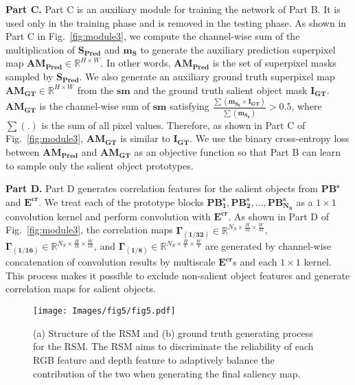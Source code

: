 \documentclass[runningheads]{llncs}
\begin{document}
	\noindent
	\textbf{Part C.} Part C is an auxiliary module for training the network of Part B. It is used only in the training phase and is removed in the testing phase. As shown in Part C in Fig.~\ref{fig:module3}, we compute the channel-wise sum of the multiplication of $\mathbf{S_{Pred}}$ and $\mathbf{m_S}$ to generate the auxiliary prediction superpixel map $\mathbf{AM_{Pred}} \in \mathbb{R} ^ {H \times W}$. In other words, $\mathbf{AM_{Pred}}$ is the set of superpixel masks sampled by $\mathbf{S_{Pred}}$. We also generate an auxiliary ground truth superpixel map $\mathbf{AM_{GT}} \in \mathbb{R} ^ {H \times W}$ from the $\mathbf{sm}$ and the ground truth salient object mask $\mathbf{I_{GT}}$. $\mathbf{AM_{GT}}$ is the channel-wise sum of $\mathbf{sm}$ satisfying $\frac{ \sum \left ( \mathbf{m _ { S _ { k } }} \times \mathbf{I _ { GT }} \right ) } { \sum \left ( \mathbf{m _ { S _ { k } }} \right ) } >0.5$, where $\sum \left( . \right)$ is the sum of all pixel values. Therefore, as shown in Part C of Fig.~\ref{fig:module3}, $\mathbf{AM_{GT}}$ is similar to $\mathbf{I_{GT}}$. We use the binary cross-entropy loss between $\mathbf{AM_{Pred}}$ and $\mathbf{AM_{GT}}$ as an objective function so that Part B can learn to sample only the salient object prototypes.
	
	\noindent
	\textbf{Part D.} Part D generates correlation features for the salient objects from $\mathbf{PB^{s}}$ and $\mathbf{E^{cr}}$. We treat each of the prototype blocks $\mathbf{PB^{s}_1}, \mathbf{PB^{s}_2}, ... , \mathbf{PB^{s}_{N_S}}$ as a $1 \times 1$ convolution kernel and perform convolution with $\mathbf{E^{cr}}$. As shown in Part D of Fig.~\ref{fig:module3}, the correlation maps $\mathbf{\Gamma_{\left( 1/32 \right)}} \in \mathbb{R} ^ {N_S \times \frac{ H } { 32 } \times \frac{ W } { 32 }}$, $\mathbf{\Gamma_{\left( 1/16 \right)}} \in \mathbb{R} ^ {N_S \times \frac{ H } { 16 } \times \frac{ W } { 16 }}$, and $\mathbf{\Gamma_{\left( 1/8 \right)}} \in \mathbb{R} ^ {N_S \times \frac{ H } { 8 } \times \frac{ W } { 8 }}$ are generated by channel-wise concatenation of convolution results by multiscale $\mathbf{E^{cr}}$s and each $1 \times 1$ kernel. This process makes it possible to exclude non-salient object features and generate correlation maps for salient objects.
	
	\begin{figure}[t]
		\setlength{\belowcaptionskip}{-24pt}
		\begin{center}
			\texttt{[image: Images/fig5/fig5.pdf]}
			\caption{(a) Structure of the RSM and (b) ground truth generating process for the RSM. The RSM aims to discriminate the reliability of each RGB feature and depth feature to adaptively balance the contribution of the two when generating the final saliency map.}
			\label{fig:RSM}
		\end{center}
	\end{figure} 
	
\end{document}
